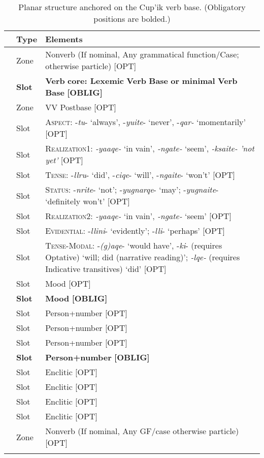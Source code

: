 \documentclass[output=paper]{langscibook}
\begin{document}
\begin{table}
\caption{Planar structure anchored on the Cup'ik verb base. (Obligatory positions are bolded.)}
\label{tab:key:1}
\begin{tabular}{Slp{9cm}}
\lsptoprule
{} & {\bfseries Type}  & {\bfseries Elements}\\ \midrule
\label{nonv} & Zone & Nonverb (If nominal, Any grammatical function/Case; otherwise particle) [OPT]\\
\label{vbase} & \textbf{Slot} & \textbf{Verb} \textbf{core\textsc{:} \textbf{L}}\textbf{exemic} \textbf{Verb} \textbf{Base} \textbf{or} \textbf{minimal} \textbf{Verb} \textbf{Base} \textbf{[OBLIG]}\\
\label{postb} & Zone & VV Postbase [OPT]\\
\label{asp} & Slot & \textsc{Aspect:} {}-\textit{tu}{}- `always', -\textit{yuite}{}- `never', -\textit{qar-} `momentarily' [OPT]\\
\label{real} & Slot & \textsc{Realization1:} \textit{{}-yaaqe-} `in vain', \textit{{}-ngate-} `seem', \textit{{}-ksaite- 'not yet'} [OPT]\\
\label{tense} & Slot & \textsc{Tense:} {}-\textit{llru}{}- `did', -\textit{ciqe}{}- `will', -\textit{ngaite}{}- `won't' [OPT]\\
\label{stat} & Slot & \textsc{Status:} {}-\textit{nrite}{}- `not'; -\textit{yugnarqe}{}- `may'; -\textit{yugnaite}{}- `definitely won't' [OPT]\\
\label{real2} & Slot & \textsc{Realization2:} \textit{{}-yaaqe-} `in vain', \textit{{}-ngate-} `seem' [OPT]\\
\label{evid} & Slot & \textsc{Evidential}: -\textit{llini}{}- `evidently'; -\textit{lli}{}- `perhaps' [OPT]\\
\label{modcay} & Slot & \textsc{Tense-Modal:} {}-\textit{(g)aqe}{}- `would have', -\textit{ki}{}- (requires Optative) `will; did (narrative reading)'; \textit{{}-lqe-} (requires Indicative transitives) `did' [OPT]\\
\label{mood} & Slot & Mood [OPT]\\
\label{mood2} & \textbf{Slot} & \textbf{Mood} \textbf{[OBLIG]}\\
\label{pn1} & Slot & Person+number [OPT] \\
\label{pn2} & Slot & Person+number [OPT] \\
\label{pn3} & Slot & Person+number [OPT] \\
\label{pn4} & \textbf{Slot} & \textbf{Person+number} \textbf{[OBLIG]}\\
\label{enc1} & Slot & Enclitic [OPT]\\
\label{enc2} & Slot & Enclitic [OPT]\\
\label{enc3} & Slot & Enclitic [OPT]\\
\label{enc4} & Slot & Enclitic [OPT]\\
\label{nonvfin} & Zone & Nonverb (If nominal, Any GF/case otherwise particle) [OPT]\\
\lspbottomrule
\end{tabular}
\end{table}
\end{document}
